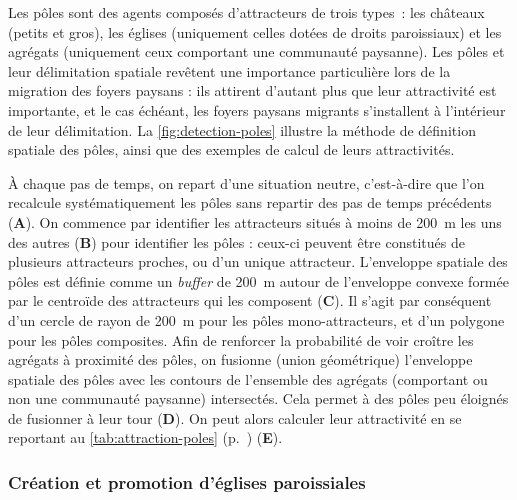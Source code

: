 Les pôles sont des agents composés d'attracteurs de trois types : les châteaux (petits et gros), les églises (uniquement celles dotées de droits paroissiaux) et les agrégats (uniquement ceux comportant une communauté paysanne).
Les pôles et leur délimitation spatiale revêtent une importance particulière lors de la migration des foyers paysans : ils attirent d'autant plus que leur attractivité est importante, et le cas échéant, les foyers paysans migrants s'installent à l'intérieur de leur délimitation.
La \cref{fig:detection-poles} illustre la méthode de définition spatiale des pôles, ainsi que des exemples de calcul de leurs attractivités.

À chaque pas de temps, on repart d'une situation \og neutre\fg{}, c'est-à-dire que l'on recalcule systématiquement les pôles sans repartir des pas de temps précédents (\textbf{A}).
On commence par identifier les attracteurs situés à moins de 200~m les uns des autres (\textbf{B}) pour identifier les pôles : ceux-ci peuvent être constitués de plusieurs attracteurs proches, ou d'un unique attracteur.
L'enveloppe spatiale des pôles est définie comme un \textit{buffer} de 200~m autour de l'enveloppe convexe formée par le centroïde des attracteurs qui les composent (\textbf{C}).
Il s'agit par conséquent d'un cercle de rayon de 200~m pour les pôles mono-attracteurs, et d'un polygone pour les pôles composites.
Afin de renforcer la probabilité de voir croître les agrégats à proximité des pôles, on fusionne (union géométrique) l'enveloppe spatiale des pôles avec les contours de l'ensemble des agrégats (comportant ou non une communauté paysanne) intersectés.
Cela permet à des pôles peu éloignés de fusionner à leur tour (\textbf{D}).
On peut alors calculer leur attractivité en se reportant au \cref{tab:attraction-poles} (p.~\pageref{tab:attraction-poles}) (\textbf{E}).


	
	\subsubsection{Création et promotion d'églises paroissiales \label{sssec:paroisses}}
	
